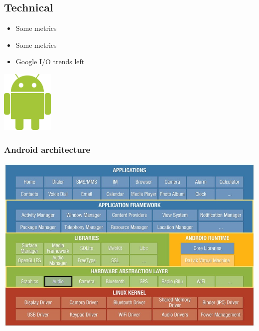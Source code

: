 \subsection{Technical}
\begin{frame}
    \begin{minipage}{0.49\textwidth}
        \begin{itemize}
            \item Some metrics
            \item Some metrics
            \item Google I/O trends left
        \end{itemize}
    \end{minipage}
    \begin{minipage}{0.49\textwidth}
        \flushright
        \includegraphics[height=3cm]{./img/androidLogo.png}
    \end{minipage}
\end{frame}
\begin{frame}
    \frametitle{Android architecture}
    \includegraphics[width=\textwidth]{../../report/src/img/android-archi-audio-hal.jpeg}
\end{frame}

